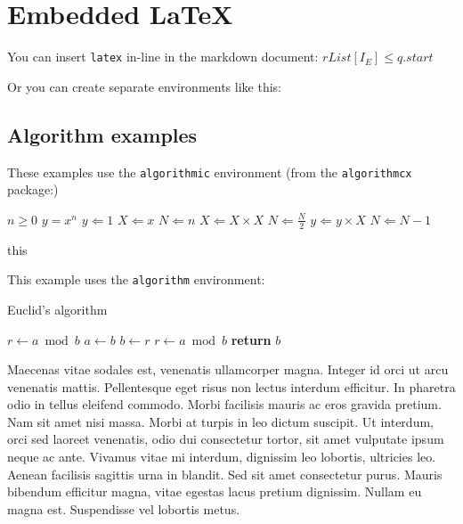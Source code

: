 \documentclass[10pt]{article}
\begin{document}
\hypertarget{embedded-latex}{%
\section{Embedded LaTeX}\label{embedded-latex}}

You can insert \texttt{latex} in-line in the markdown document:
\(rList[I_E] \leq q.start\)

Or you can create separate environments like this:

\hypertarget{algorithm-examples}{%
\subsection{Algorithm examples}\label{algorithm-examples}}

These examples use the \texttt{algorithmic} environment (from the
\texttt{algorithmcx} package:)

\begin{algorithmic}
\Require $n \geq 0$
\Ensure $y = x^n$
\State $y \Leftarrow 1$
\State $X \Leftarrow x$
\State $N \Leftarrow n$
  \State $X \Leftarrow X \times X$
  \State $N \Leftarrow \frac{N}{2} $  
  \State $y \Leftarrow y \times X$
  \State $N \Leftarrow N - 1$
\EndIf
\EndWhile
\end{algorithmic}

\begin{algorithmic}[1]
\Repeat
{}
\State this
\end{algorithmic}

This example uses the \texttt{algorithm} environment:

\begin{algorithm}
\caption{Euclid’s algorithm}\label{euclid}
\begin{algorithmic}[1]
\State $r\gets a\bmod b$
\State $a\gets b$
\State $b\gets r$
\State $r\gets a\bmod b$
\EndWhile\label{euclidendwhile}
\State \textbf{return} $b$
\EndProcedure
\end{algorithmic}
\end{algorithm}

Maecenas vitae sodales est, venenatis ullamcorper magna. Integer id orci
ut arcu venenatis mattis. Pellentesque eget risus non lectus interdum
efficitur. In pharetra odio in tellus eleifend commodo. Morbi facilisis
mauris ac eros gravida pretium. Nam sit amet nisi massa. Morbi at turpis
in leo dictum suscipit. Ut interdum, orci sed laoreet venenatis, odio
dui consectetur tortor, sit amet vulputate ipsum neque ac ante. Vivamus
vitae mi interdum, dignissim leo lobortis, ultricies leo. Aenean
facilisis sagittis urna in blandit. Sed sit amet consectetur purus.
Mauris bibendum efficitur magna, vitae egestas lacus pretium dignissim.
Nullam eu magna est. Suspendisse vel lobortis metus.
\end{document}
